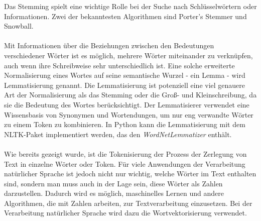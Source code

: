  Das Stemming spielt eine wichtige Rolle bei der Suche nach Schlüsselwörtern oder Informationen. 
Zwei der bekanntesten Algorithmen sind Porter's Stemmer und Snowball.\\\\
Mit Informationen über die Beziehungen zwischen den Bedeutungen verschiedener Wörter ist es möglich, mehrere Wörter miteinander zu verknüpfen, auch wenn ihre Schreibweise sehr unterschiedlich ist. 
Eine solche erweiterte Normalisierung eines Wortes auf seine semantische Wurzel - ein Lemma - wird Lemmatisierung genannt. 
Die Lemmatisierung ist potenziell eine viel genauere Art der Normalisierung als das Stemming oder die Groß- und Kleinschreibung, da sie die Bedeutung des Wortes berücksichtigt. 
Der Lemmatisierer verwendet eine Wissensbasis von Synonymen und Wortendungen, um nur eng verwandte Wörter zu einem Token zu kombinieren. 
In Python kann die Lemmatisierung mit dem \ac{NLTK}-Paket implementiert werden, das den \textit{WordNetLemmatizer} enthält.\\\\
Wie bereits gezeigt wurde, ist die Tokenisierung der Prozess der Zerlegung von Text in einzelne Wörter oder Token. 
Für viele Anwendungen der Verarbeitung natürlicher Sprache ist jedoch nicht nur wichtig, welche Wörter im Text enthalten sind, sondern man muss auch in der Lage sein, diese Wörter als Zahlen darzustellen. 
Dadurch wird es möglich, maschinelles Lernen und andere Algorithmen, die mit Zahlen arbeiten, zur Textverarbeitung einzusetzen. 
Bei der Verarbeitung natürlicher Sprache wird dazu die Wortvektorisierung verwendet.
